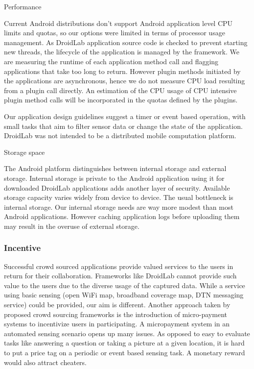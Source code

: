 \documentclass[conference,letterpaper]{IEEEtran}
\begin{document}
Performance

Current Android distributions don't support Android application level CPU limits and quotas, so our options were limited in terms of processor usage management. As DroidLab application source code is checked to prevent starting new threads, the lifecycle of the application is managed by the framework. We are measuring the runtime of each application method call and flagging applications that take too long to return. However plugin methods initiated by the applications are asynchronous, hence we do not measure CPU load resulting from a plugin call directly. An estimation of the CPU usage of CPU intensive plugin method calls will be incorporated in the quotas defined by the plugins.

Our application design guidelines suggest a timer or event based operation, with small tasks that aim to filter sensor data or change the state of the application. DroidLab was not intended to be a distributed mobile computation platform.

Storage space

The Android platform distinguishes between internal storage and external storage. Internal storage is private to the Android application using it for downloaded DroidLab applications adds another layer of security. Available storage capacity varies widely from device to device. The usual bottleneck is internal storage. Our internal storage needs are way more modest than most Android applications. However caching application logs before uploading them may result in the overuse of external storage.

\subsubsection{Incentive}

Successful crowd sourced applications provide valued services to the users in return for their collaboration. Frameworks like DroidLab cannot provide such value to the users due to the diverse usage of the captured data. While a service using basic sensing (open WiFi map, broadband coverage map, DTN messaging service) could be provided, our aim is different. Another approach taken by proposed crowd sourcing frameworks is the introduction of micro-payment systems to incentivize users in participating. A micropayment system in an automated sensing scenario opens up many issues. As opposed to easy to evaluate tasks like answering a question or taking a picture at a given location, it is hard to put a price tag on a periodic or event based sensing task. A monetary reward would also attract cheaters.
\end{document}
